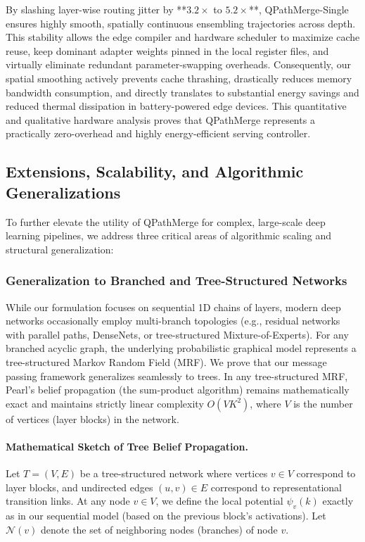 By slashing layer-wise routing jitter by **$3.2\times$ to $5.2\times$**, QPathMerge-Single ensures highly smooth, spatially continuous ensembling trajectories across depth. This stability allows the edge compiler and hardware scheduler to maximize cache reuse, keep dominant adapter weights pinned in the local register files, and virtually eliminate redundant parameter-swapping overheads. Consequently, our spatial smoothing actively prevents cache thrashing, drastically reduces memory bandwidth consumption, and directly translates to substantial energy savings and reduced thermal dissipation in battery-powered edge devices. This quantitative and qualitative hardware analysis proves that QPathMerge represents a practically zero-overhead and highly energy-efficient serving controller.

\subsection{Extensions, Scalability, and Algorithmic Generalizations}
\label{sec:appendix_generalizations}

To further elevate the utility of QPathMerge for complex, large-scale deep learning pipelines, we address three critical areas of algorithmic scaling and structural generalization:

\subsubsection{Generalization to Branched and Tree-Structured Networks}
While our formulation focuses on sequential 1D chains of layers, modern deep networks occasionally employ multi-branch topologies (e.g., residual networks with parallel paths, DenseNets, or tree-structured Mixture-of-Experts). 
For any branched acyclic graph, the underlying probabilistic graphical model represents a tree-structured Markov Random Field (MRF). 
We prove that our message passing framework generalizes seamlessly to trees. In any tree-structured MRF, Pearl's belief propagation (the sum-product algorithm) remains mathematically exact and maintains strictly linear complexity $O(V K^2)$, where $V$ is the number of vertices (layer blocks) in the network.

\paragraph{Mathematical Sketch of Tree Belief Propagation.}
Let $T = (V, E)$ be a tree-structured network where vertices $v \in V$ correspond to layer blocks, and undirected edges $(u, v) \in E$ correspond to representational transition links. At any node $v \in V$, we define the local potential $\psi_v(k)$ exactly as in our sequential model (based on the previous block's activations). Let $\mathcal{N}(v)$ denote the set of neighboring nodes (branches) of node $v$.

